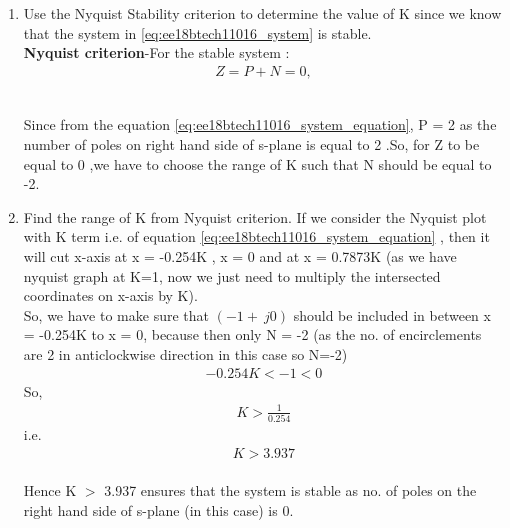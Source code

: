 \begin{enumerate}[label=\thesection.\arabic*.,ref=\thesection.\theenumi]
\item  Use the Nyquist Stability criterion to determine the value of K since we know that the system in \eqref{eq:ee18btech11016_system} is stable.
\\
\solution  \textbf{Nyquist criterion}-For the stable system :
\begin{align}
\label{eq:ee18btech11016_system_nyquist}
Z = P+N = 0,    
\end{align}
\begin{table}[!ht]
\centering

\caption{}
\label{table:ee18btech11016}
\end{table}
\\
Since from the equation \eqref{eq:ee18btech11016_system_equation}, P = 2 as the number of poles on right hand side of s-plane is equal to 2 .So, for Z to be equal to 0 ,we have to choose the range of K such that N should be equal to -2.
\\
\item Find the range of K from Nyquist criterion.
\solution If we consider the Nyquist plot with K term i.e. of equation \eqref{eq:ee18btech11016_system_equation} , then it will cut x-axis at x = -0.254K , x = 0 and at x = 0.7873K (as we have nyquist graph at K=1, now we just need to multiply the intersected coordinates on x-axis by K). 
\\

So, we have to make sure that $(-1+\ j0)$ should be included in between x = -0.254K to x = 0, because then only N = -2 (as the no. of encirclements are 2 in anticlockwise direction in this case so N=-2)
\begin{align}
-0.254K < -1 < 0
\end{align}
So,
\begin{align}
K > \frac{1}{0.254}
\end{align}
i.e.
\begin{align}
K > 3.937
\end{align}
\\
Hence K $>$ 3.937 ensures that the system is stable as no. of poles on the right hand side of s-plane (in this case) is 0.
\end{enumerate}
